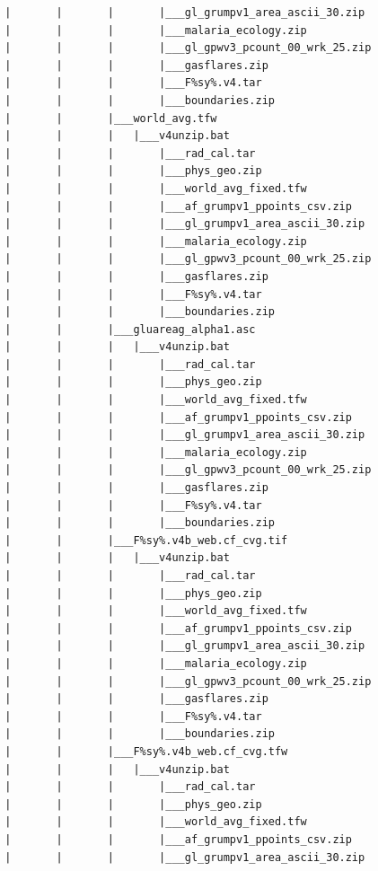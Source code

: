 \documentclass[]{book}
\begin{document}
\begin{verbatim}
        |       |       |       |___gl_grumpv1_area_ascii_30.zip
        |       |       |       |___malaria_ecology.zip
        |       |       |       |___gl_gpwv3_pcount_00_wrk_25.zip
        |       |       |       |___gasflares.zip
        |       |       |       |___F%sy%.v4.tar
        |       |       |       |___boundaries.zip
        |       |       |___world_avg.tfw
        |       |       |   |___v4unzip.bat
        |       |       |       |___rad_cal.tar
        |       |       |       |___phys_geo.zip
        |       |       |       |___world_avg_fixed.tfw
        |       |       |       |___af_grumpv1_ppoints_csv.zip
        |       |       |       |___gl_grumpv1_area_ascii_30.zip
        |       |       |       |___malaria_ecology.zip
        |       |       |       |___gl_gpwv3_pcount_00_wrk_25.zip
        |       |       |       |___gasflares.zip
        |       |       |       |___F%sy%.v4.tar
        |       |       |       |___boundaries.zip
        |       |       |___gluareag_alpha1.asc
        |       |       |   |___v4unzip.bat
        |       |       |       |___rad_cal.tar
        |       |       |       |___phys_geo.zip
        |       |       |       |___world_avg_fixed.tfw
        |       |       |       |___af_grumpv1_ppoints_csv.zip
        |       |       |       |___gl_grumpv1_area_ascii_30.zip
        |       |       |       |___malaria_ecology.zip
        |       |       |       |___gl_gpwv3_pcount_00_wrk_25.zip
        |       |       |       |___gasflares.zip
        |       |       |       |___F%sy%.v4.tar
        |       |       |       |___boundaries.zip
        |       |       |___F%sy%.v4b_web.cf_cvg.tif
        |       |       |   |___v4unzip.bat
        |       |       |       |___rad_cal.tar
        |       |       |       |___phys_geo.zip
        |       |       |       |___world_avg_fixed.tfw
        |       |       |       |___af_grumpv1_ppoints_csv.zip
        |       |       |       |___gl_grumpv1_area_ascii_30.zip
        |       |       |       |___malaria_ecology.zip
        |       |       |       |___gl_gpwv3_pcount_00_wrk_25.zip
        |       |       |       |___gasflares.zip
        |       |       |       |___F%sy%.v4.tar
        |       |       |       |___boundaries.zip
        |       |       |___F%sy%.v4b_web.cf_cvg.tfw
        |       |       |   |___v4unzip.bat
        |       |       |       |___rad_cal.tar
        |       |       |       |___phys_geo.zip
        |       |       |       |___world_avg_fixed.tfw
        |       |       |       |___af_grumpv1_ppoints_csv.zip
        |       |       |       |___gl_grumpv1_area_ascii_30.zip

\end{verbatim}
\end{document}
